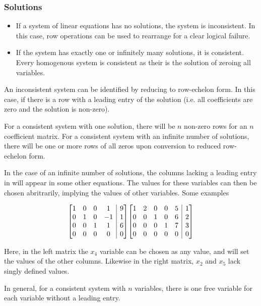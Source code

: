 \documentclass[12pt]{report}
\makeatletter
\newenvironment{amatrix}[1]{
    \left[\begin{array}{@{}*{#1}{c}|c@{}}
}{
    \end{array}\right]
}
\makeatother
\begin{document}
\begin{flushleft}
\subsubsection*{Solutions}

\begin{itemize}
    \item If a system of linear equations has no solutions, the system is
        inconsistent. In this case, row operations can be used to rearrange for a
        clear logical failure.
    \item If the system has exactly one or infinitely many solutions, it is
        consistent. Every homogenous system is consistent as their is the
        solution of zeroing all variables.
\end{itemize}

An inconsistent system can be identified by reducing to row-echelon form. In
this case, if there is a row with a leading entry of the solution (i.e. all
coefficients are zero and the solution is non-zero). \par
For a consistent system with one solution, there will be \(n\) non-zero rows for
an \(n\) coefficient matrix. For a consistent system with an infinite number of
solutions, there will be one or more rows of all zeros upon conversion to
reduced row-echelon form. \par
In the case of an infinite number of solutions, the columns lacking a leading
entry in will appear in some other equations. The values for these
variables can then be chosen abritrarily, implying the values of other
variables. Some examples

\[
    \begin{amatrix}{4}
        1 & 0 & 0 & 1 & 9 \\
        0 & 1 & 0 & -1 & 1 \\
        0 & 0 & 1 & 1 & 6 \\
        0 & 0 & 0 & 0 & 0 \\
    \end{amatrix}
    \begin{amatrix}{5}
        1 & 2 & 0 & 0 & 5 & 1 \\
        0 & 0 & 1 & 0 & 6 & 2 \\
        0 & 0 & 0 & 1 & 7 & 3 \\
        0 & 0 & 0 & 0 & 0 & 0 \\
    \end{amatrix}
\]

Here, in the left matrix the \(x_4\) variable can be chosen as any value, and
will set the values of the other columns. Likewise in the right matrix, \(x_2\)
and \(x_5\) lack singly defined values. \par
In general, for a consistent system with \(n\) variables, there is one free
variable for each variable without a leading entry.


\end{flushleft}
\end{document}

